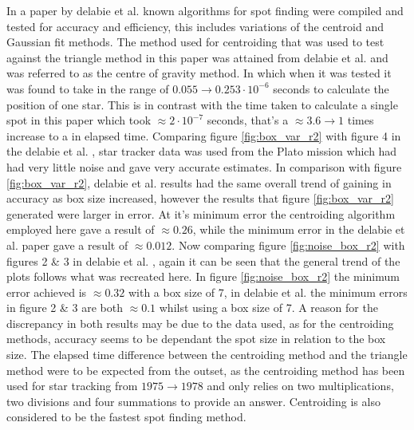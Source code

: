 \documentclass[aps,pra,a4paper,nofootinbib,onecolumn,tightenlines,longbibliography,12pt,amsfonts,amssymb,amsmath,floatfix]{revtex4-2} %
\begin{document}
  In a paper by delabie et al. \cite{delabie2014accurate} known algorithms for spot finding were compiled 
  and tested for accuracy and efficiency, this includes variations of the centroid and Gaussian fit methods.
  The method used for centroiding that was used to test against the triangle method in this paper was attained 
  from delabie et al. \cite{delabie2014accurate} and was referred to as the centre of gravity method. In which when 
  it was tested it was found to take in the range of $0.055\rightarrow 0.253\cdot 10^{-6}$ seconds to calculate 
  the position of one star. This is in contrast with the time taken to calculate a single spot in this paper which 
  took $\approx 2\cdot 10^{-7}$ seconds, that's a $\approx 3.6\rightarrow 1$ times increase to a in elapsed 
  time. Comparing figure \ref{fig:box_var_r2} with figure 4 in the delabie et al. \cite{delabie2014accurate},
  star tracker data was used from the Plato mission which had had very little noise and gave very accurate estimates. 
  In comparison with figure \ref{fig:box_var_r2}, delabie et al. results had the same overall trend of gaining in accuracy 
  as box size increased, however the results that figure \ref{fig:box_var_r2} generated were larger in error. At it's 
  minimum error the centroiding algorithm employed here gave a result of $\approx 0.26$, while the minimum error 
  in the delabie et al. paper gave a result of $\approx 0.012$. 
  Now comparing figure \ref{fig:noise_box_r2} with figures 2 \& 3 in delabie et al. \cite{delabie2014accurate}, again 
  it can be seen that the general trend of the plots follows what was recreated here. In figure \ref{fig:noise_box_r2} 
  the minimum error achieved is $\approx 0.32$ with a box size of 7, in delabie et al. the minimum errors in figure 
  2 \& 3 are both $\approx 0.1$ whilst using a box size of 7. A reason for the discrepancy in both results may be due 
  to the data used, as for the centroiding methods, accuracy seems to be dependant the spot size in relation to the 
  box size. The elapsed time difference between the centroiding method and the triangle method were to be expected 
  from the outset, as the centroiding method has been used for star tracking from $1975 \rightarrow 1978$ and only 
  relies on two multiplications, two divisions and four summations to provide an answer. Centroiding is also 
  considered to be the fastest spot finding method.\cite{delabie2014accurate}
\end{document}
